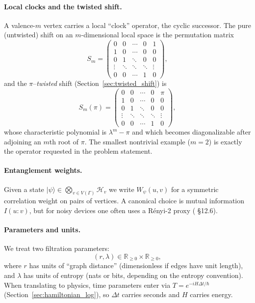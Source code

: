 \documentclass[11pt,oneside]{amsbook}
\numberwithin{equation}{section}
\theoremstyle{plain}
\theoremstyle{definition}
\theoremstyle{remark}
\newcommand{\RR}{\mathbb{R}}
\newcommand{\cH}{\mathcal{H}}
\begin{document}
\paragraph{Local clocks and the twisted shift.}
A valence-$m$ vertex carries a local ``clock'' operator, the cyclic successor.
The pure (untwisted) shift on an $m$-dimensional local space is the permutation matrix
\[
S_m=\begin{pmatrix}
0&0&\cdots&0&1\\
1&0&\cdots&0&0\\
0&1&\ddots&0&0\\
\vdots&\ddots&\ddots&\ddots&\vdots\\
0&0&\cdots&1&0
\end{pmatrix},
\]
and the $\pi$--\emph{twisted} shift (Section~\ref{sec:twisted_shift}) is
\[
S_m(\pi)=\begin{pmatrix}
0&0&\cdots&0&\pi\\
1&0&\cdots&0&0\\
0&1&\ddots&0&0\\
\vdots&\ddots&\ddots&\ddots&\vdots\\
0&0&\cdots&1&0
\end{pmatrix},
\]
whose characteristic polynomial is $\lambda^m-\pi$ and which becomes diagonalizable after adjoining an $m$th root of $\pi$.
The smallest nontrivial example ($m=2$) is exactly the operator requested in the problem statement.

\paragraph{Entanglement weights.}
Given a state $|\psi\rangle\in\bigotimes_{v\in V(\Gamma)}\cH_v$ we write $W_\psi(u,v)$ for a symmetric correlation weight on pairs of vertices.
A canonical choice is mutual information $I(u\!:\!v)$, but for noisy devices one often uses a Rényi-2 proxy ( \S12.6).

\paragraph{Parameters and units.}
We treat two filtration parameters:
\[
(r,\lambda)\in\RR_{\ge 0}\times\RR_{\ge 0},
\]
where $r$ has units of ``graph distance'' (dimensionless if edges have unit length), and $\lambda$ has units of entropy (nats or bits, depending on the entropy convention).
When translating to physics, time parameters enter via $T=e^{-iH\Delta t/\hbar}$ (Section~\ref{sec:hamiltonian_log}), so $\Delta t$ carries seconds and $H$ carries energy.
\end{document}
